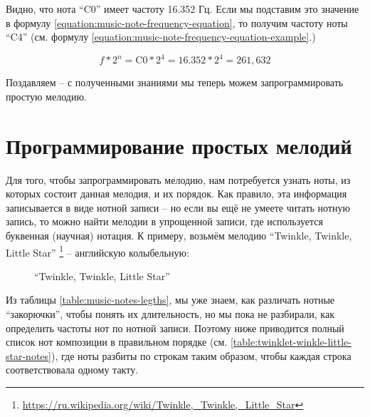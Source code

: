 \documentclass[a4paper,twoside]{book}
\begin{document}
Видно, что нота ``C0'' имеет частоту 16.352 Гц. Если мы подставим это значение в
формулу \ref{equation:music-note-frequency-equation}, то получим частоту ноты
``C4'' (см. формулу \ref{equation:music-note-frequency-equation-example}.)

\begin{equation}
  f * 2^n = \mbox{C0} * 2^4 = 16.352 * 2^4 = 261,632
  \label{equation:music-note-frequency-equation-example}
\end{equation}

Поздавляем -- с полученными знаниями мы теперь можем запрограммировать простую
мелодию.

\section{Программирование простых мелодий}

Для того, чтобы запрограммировать мелодию, нам потребуется узнать ноты, из
которых состоит данная мелодия, и их порядок. Как правило, эта информация
записывается в виде нотной записи -- но если вы ещё не умеете читать нотную
запись, то можно найти мелодии в упрощенной записи, где используется буквенная
(научная) нотация. К примеру, возьмём мелодию ``Twinkle, Twinkle, Little
Star'' \footnote{\url{https://ru.wikipedia.org/wiki/Twinkle,_Twinkle,_Little_Star}}
-- английскую колыбельную:

\begin{figure}[ht]
  \caption{``Twinkle, Twinkle, Little Star''}
  \centering
  \label{fig:sound-fig-3}
\end{figure}

Из таблицы \ref{table:music-notes-legths}, мы уже знаем, как различать нотные
``закорючки'', чтобы понять их длительность, но мы пока не разбирали, как
определить частоты нот по нотной записи. Поэтому ниже приводится полный список
нот композиции в правильном порядке (см.
\ref{table:twinklet-winkle-little-star-notes}), где ноты разбиты по строкам
таким образом, чтобы каждая строка соответствовала одному такту.
\end{document}
